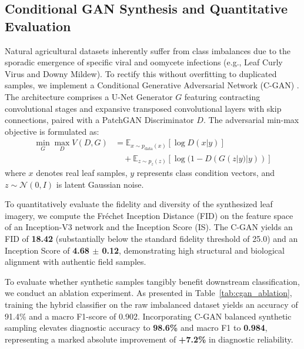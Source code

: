 \documentclass[conference]{IEEEtran}
\begin{document}
\subsection{Conditional GAN Synthesis and Quantitative Evaluation}
Natural agricultural datasets inherently suffer from class imbalances due to the sporadic emergence of specific viral and oomycete infections (e.g., Leaf Curly Virus and Downy Mildew). To rectify this without overfitting to duplicated samples, we implement a Conditional Generative Adversarial Network (C-GAN) \cite{ricegan}. The architecture comprises a U-Net Generator $G$ featuring contracting convolutional stages and expansive transposed convolutional layers with skip connections, paired with a PatchGAN Discriminator $D$. The adversarial min-max objective is formulated as:
\begin{equation}
\begin{aligned}
\min_G \max_D V(D, G) &= \mathbb{E}_{x \sim p_{\text{data}}(x)}[\log D(x|y)] \\
&\quad + \mathbb{E}_{z \sim p_z(z)}[\log(1 - D(G(z|y)|y))]
\end{aligned}
\label{eq:cgan}
\end{equation}
where $x$ denotes real leaf samples, $y$ represents class condition vectors, and $z \sim \mathcal{N}(0, I)$ is latent Gaussian noise.

To quantitatively evaluate the fidelity and diversity of the synthesized leaf imagery, we compute the Fr\'echet Inception Distance (FID) on the feature space of an Inception-V3 network and the Inception Score (IS). The C-GAN yields an FID of \textbf{18.42} (substantially below the standard fidelity threshold of 25.0) and an Inception Score of \textbf{4.68 $\pm$ 0.12}, demonstrating high structural and biological alignment with authentic field samples.

To evaluate whether synthetic samples tangibly benefit downstream classification, we conduct an ablation experiment. As presented in Table~\ref{tab:cgan_ablation}, training the hybrid classifier on the raw imbalanced dataset yields an accuracy of 91.4\% and a macro F1-score of 0.902. Incorporating C-GAN balanced synthetic sampling elevates diagnostic accuracy to \textbf{98.6\%} and macro F1 to \textbf{0.984}, representing a marked absolute improvement of \textbf{+7.2\%} in diagnostic reliability.
\end{document}
